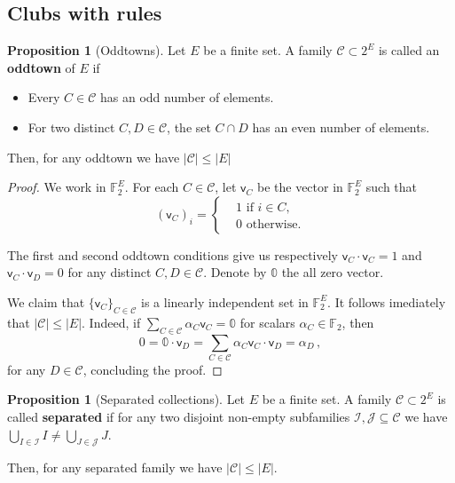 \documentclass[12pt]{amsart}
\theoremstyle{definition}
\newtheorem{prop}[thm]{Proposition}
\newcommand{\F}{\mathbb{F}}
\newcommand{\CC}{\mathcal C}
\newcommand{\JJ}{\mathcal J}
\newcommand{\II}{\mathcal I}
\newcommand{\vv}{\mathsf{v}}
\begin{document}
\subsection{Clubs with rules}


\begin{prop}[Oddtowns]\label{prop:oddtown}
Let $E$ be a finite set.
A family $\CC \subset 2^E $ is called an \textbf{oddtown} of $E$ if
\begin{itemize}
\item Every $C \in \CC $ has an odd number of elements.

\item For two distinct $C, D \in \CC$, the set $C\cap D$ has an even number of elements.
\end{itemize}

Then, for any oddtown we have $|\CC| \leq |E|$
\end{prop}


\begin{proof}
We work in $\F_2^E$.
For each $C \in \CC$, let $\vv_C$ be the vector in $\F_2^E$ such that 
$$ (\vv_C)_i =\begin{cases*}
      & 1 \text{ if $i \in C$,}\\
      & 0 \text{ otherwise.}
    \end{cases*} $$

The first and second oddtown conditions give us respectively $\vv_C \cdot \vv_C = 1$ and $\vv_C \cdot \vv_D = 0 $ for any distinct $C, D \in \CC$.
Denote by $\mathbb{0}$ the all zero vector.

We claim that $\{\vv_C\}_{C \in \CC}$ is a linearly independent set in $\F_2^E$.
It follows imediately that $|\CC| \leq |E|$.
Indeed, if $\sum_{C \in \CC} \alpha_C \vv_C = \mathbb{0}$ for scalars $\alpha_C \in \F_2$, then
$$ 0 = \mathbb{0} \cdot \vv_D = \sum_{C \in \CC} \alpha_C \vv_C\cdot \vv_D = \alpha_D\, ,$$
for any $D \in \CC$, concluding the proof.
\end{proof}


\begin{prop}[Separated collections]
Let $E$ be a finite set.
A family $\CC \subset 2^E $ is called \textbf{separated} if for any two disjoint non-empty subfamilies $\II, \JJ \subseteq \CC$ we have $\bigcup_{I\in\II} I \neq \bigcup_{J\in\JJ} J$.

Then, for any separated family we have $|\CC| \leq |E|$.
\end{prop}
\end{document}
